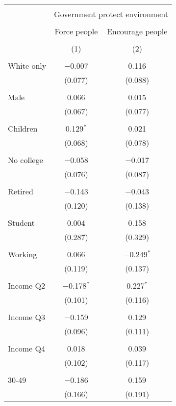 
\begin{tabular}{@{\extracolsep{5pt}}lcc} 
\\[-1.8ex]\hline 
\hline \\[-1.8ex] 
 & \multicolumn{2}{c}{Government protect environment} \\ 
\cline{2-3} 
\\[-1.8ex] & Force people & Encourage people \\ 
\\[-1.8ex] & (1) & (2)\\ 
\hline \\[-1.8ex] 
 White only & $-$0.007 & 0.116 \\ 
  & (0.077) & (0.088) \\ 
  & & \\ 
 Male & 0.066 & 0.015 \\ 
  & (0.067) & (0.077) \\ 
  & & \\ 
 Children & 0.129$^{*}$ & 0.021 \\ 
  & (0.068) & (0.078) \\ 
  & & \\ 
 No college & $-$0.058 & $-$0.017 \\ 
  & (0.076) & (0.087) \\ 
  & & \\ 
 Retired & $-$0.143 & $-$0.043 \\ 
  & (0.120) & (0.138) \\ 
  & & \\ 
 Student & 0.004 & 0.158 \\ 
  & (0.287) & (0.329) \\ 
  & & \\ 
 Working & 0.066 & $-$0.249$^{*}$ \\ 
  & (0.119) & (0.137) \\ 
  & & \\ 
 Income Q2 & $-$0.178$^{*}$ & 0.227$^{*}$ \\ 
  & (0.101) & (0.116) \\ 
  & & \\ 
 Income Q3 & $-$0.159 & 0.129 \\ 
  & (0.096) & (0.111) \\ 
  & & \\ 
 Income Q4 & 0.018 & 0.039 \\ 
  & (0.102) & (0.117) \\ 
  & & \\ 
 30-49 & $-$0.186 & 0.159 \\ 
  & (0.166) & (0.191) \\ 

\end{tabular}
